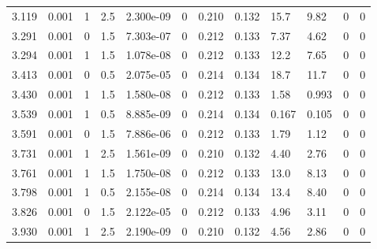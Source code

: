 \documentclass[preview]{standalone}
\begin{document}
{{\begin{tabular}{L{1.2cm}C{1.2cm} C{0.3cm}C{0.5cm} C{1.4cm}C{1.4cm} C{1.4cm}C{1.4cm} C{1.6cm}C{1.6cm} C{1.6cm}C{1.6cm}}
  3.119  &  0.001  & 1     & 2.5 &  2.300e-09  & 0  &  0.210&   0.132& 15.7 & 9.82   &  0 & 0  \\ 
  3.291  &  0.001  & 0     & 1.5 &  7.303e-07  & 0  &  0.212&   0.133& 7.37 & 4.62   &  0 & 0  \\ 
  3.294  &  0.001  & 1     & 1.5 &  1.078e-08  & 0  &  0.212&   0.133& 12.2 & 7.65   &  0 & 0  \\ 
  3.413  &  0.001  & 0     & 0.5 &  2.075e-05  & 0  &  0.214&   0.134& 18.7 & 11.7   &  0 & 0  \\ 
  3.430  &  0.001  & 1     & 1.5 &  1.580e-08  & 0  &  0.212&   0.133& 1.58 & 0.993   &  0 & 0  \\ 
  3.539  &  0.001  & 1     & 0.5 &  8.885e-09  & 0  &  0.214&   0.134& 0.167 & 0.105   &  0 & 0  \\ 
  3.591  &  0.001  & 0     & 1.5 &  7.886e-06  & 0  &  0.212&   0.133& 1.79 & 1.12   &  0 & 0  \\ 
  3.731  &  0.001  & 1     & 2.5 &  1.561e-09  & 0  &  0.210&   0.132& 4.40 & 2.76   &  0 & 0  \\ 
  3.761  &  0.001  & 1     & 1.5 &  1.750e-08  & 0  &  0.212&   0.133& 13.0 & 8.13   &  0 & 0  \\ 
  3.798  &  0.001  & 1     & 0.5 &  2.155e-08  & 0  &  0.214&   0.134& 13.4 & 8.40   &  0 & 0  \\ 
  3.826  &  0.001  & 0     & 1.5 &  2.122e-05  & 0  &  0.212&   0.133& 4.96 & 3.11   &  0 & 0  \\ 
  3.930  &  0.001  & 1     & 2.5 &  2.190e-09  & 0  &  0.210&   0.132& 4.56 & 2.86   &  0 & 0  \\ 
\hline 
\end{tabular} 

}}
\end{document}
